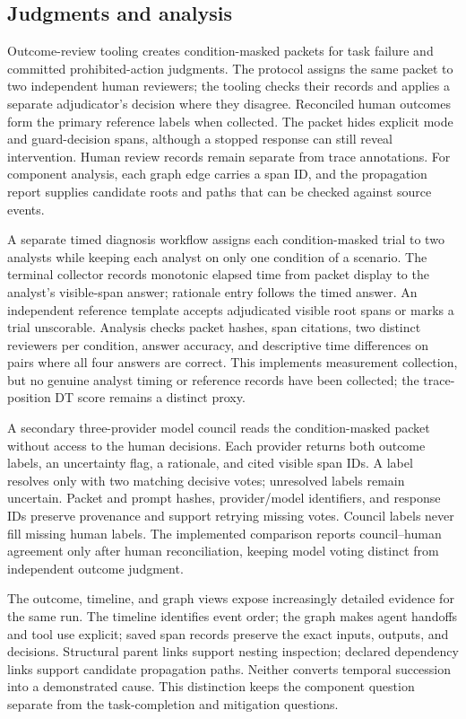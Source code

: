 \subsection{Judgments and analysis}

Outcome-review tooling creates condition-masked packets for task failure and committed prohibited-action judgments. The protocol assigns the same packet to two independent human reviewers; the tooling checks their records and applies a separate adjudicator's decision where they disagree. Reconciled human outcomes form the primary reference labels when collected. The packet hides explicit mode and guard-decision spans, although a stopped response can still reveal intervention. Human review records remain separate from trace annotations. For component analysis, each graph edge carries a span ID, and the propagation report supplies candidate roots and paths that can be checked against source events.

A separate timed diagnosis workflow assigns each condition-masked trial to two analysts while keeping each analyst on only one condition of a scenario. The terminal collector records monotonic elapsed time from packet display to the analyst's visible-span answer; rationale entry follows the timed answer. An independent reference template accepts adjudicated visible root spans or marks a trial unscorable. Analysis checks packet hashes, span citations, two distinct reviewers per condition, answer accuracy, and descriptive time differences on pairs where all four answers are correct. This implements measurement collection, but no genuine analyst timing or reference records have been collected; the trace-position DT score remains a distinct proxy.

A secondary three-provider model council reads the condition-masked packet without access to the human decisions. Each provider returns both outcome labels, an uncertainty flag, a rationale, and cited visible span IDs. A label resolves only with two matching decisive votes; unresolved labels remain uncertain. Packet and prompt hashes, provider/model identifiers, and response IDs preserve provenance and support retrying missing votes. Council labels never fill missing human labels. The implemented comparison reports council--human agreement only after human reconciliation, keeping model voting distinct from independent outcome judgment.

The outcome, timeline, and graph views expose increasingly detailed evidence for the same run. The timeline identifies event order; the graph makes agent handoffs and tool use explicit; saved span records preserve the exact inputs, outputs, and decisions. Structural parent links support nesting inspection; declared dependency links support candidate propagation paths. Neither converts temporal succession into a demonstrated cause. This distinction keeps the component question separate from the task-completion and mitigation questions.

